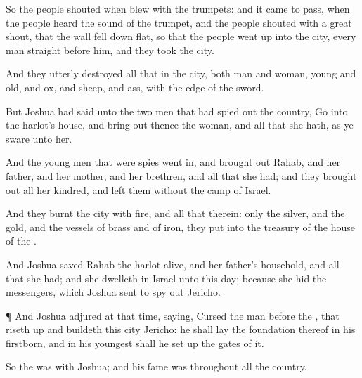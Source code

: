 {So the
people
shouted when
{}
blew with the
trumpets: and it came to pass, when the
people
heard the
sound of the
trumpet, and the
people
shouted with a
great
shout, that the
wall fell down
flat, so that the
people went
up into the
city, every
man straight before him, and they
took the
city.

And they utterly
destroyed all that
{} in the
city, both
man and
woman,
young and
old, and
ox, and
sheep, and
ass, with the
edge of the
sword.

But
Joshua had
said unto the
two
men that had spied
out the
country,
Go into the
harlot’s
house, and bring
out thence the
woman, and all that she hath, as ye
sware unto her.

And the young
men that were
spies went
in, and brought
out
Rahab, and her
father, and her
mother, and her
brethren, and all that she had; and they brought
out all her
kindred, and
left them
without the
camp of
Israel.

And they
burnt the
city with
fire, and all that
{} therein: only the
silver, and the
gold, and the
vessels of
brass and of
iron, they
put into the
treasury of the
house of the
{}.

And
Joshua
saved
Rahab the
harlot
alive, and her
father’s
household, and all that she had; and she
dwelleth
in
Israel
{} unto this
day; because she
hid the
messengers, which
Joshua
sent to spy
out
Jericho.


\par }{\PP {}¶ And
Joshua
adjured
{} at that
time,
saying,
Cursed
{} the
man
before the
{}, that riseth
up and
buildeth this
city
Jericho: he shall lay the
foundation thereof in his
firstborn, and in his
youngest
{} shall he set
up the
gates of it.

So the
{} was with
Joshua; and his
fame was
{} throughout all the
country.




\par }
